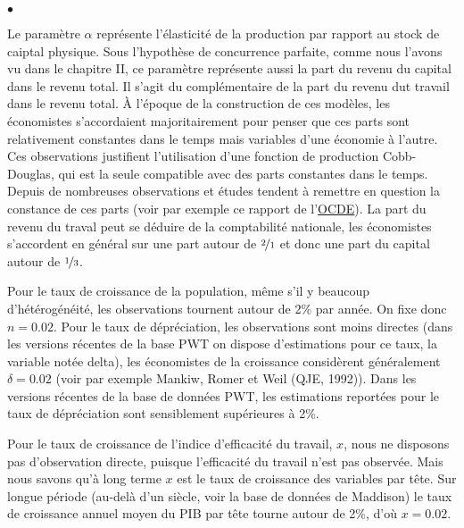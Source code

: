 \documentclass[10pt,notheorems]{beamer}
\theoremstyle{plain}
\theoremstyle{definition} %
\begin{document}
\begin{notes}

  \begin{list}{$\bullet$}{}

  \item Le paramètre $\alpha$ représente l'élasticité de la production par
    rapport au stock de caiptal physique. Sous l'hypothèse de concurrence
    parfaite, comme nous l'avons vu dans le chapitre II, ce paramètre représente
    aussi la part du revenu du capital dans le revenu total. Il s'agit du
    complémentaire de la part du revenu dut travail dans le revenu total. À
    l'époque de la construction de ces modèles, les économistes s'accordaient
    majoritairement pour penser que ces parts sont relativement constantes dans
    le temps mais variables d'une économie à l'autre. Ces observations
    justifient l'utilisation d'une fonction de production Cobb-Douglas, qui est
    la seule compatible avec des parts constantes dans le temps. Depuis de
    nombreuses observations et études tendent à remettre en question la
    constance de ces parts (voir par exemple ce rapport de
    l'\href{https://www.oecd.org/g20/topics/employment-and-social-policy/The-Labour-Share-in-G20-Economies.pdf}{OCDE}).
    La part du revenu du traval peut se déduire de la comptabilité nationale,
    les économistes s'accordent en général sur une part autour de
    $\nicefrac{2}{1}$ et donc une part du capital autour de $\nicefrac{1}{3}$.\newline

  \item Pour le taux de croissance de la population, même s'il y beaucoup
    d'hétérogénéité, les observations tournent autour de 2\% par année. On fixe
    donc $n=0.02$. Pour le taux de dépréciation, les observations sont moins
    directes (dans les versions récentes de la base PWT on dispose d'estimations
    pour ce taux, la variable notée \textrm{delta}), les économistes de la
    croissance considèrent généralement $\delta=0.02$ (voir par exemple Mankiw,
    Romer et Weil (QJE, 1992)). Dans les versions récentes de la base de données
    PWT, les estimations reportées pour le taux de dépréciation sont
    sensiblement supérieures à 2\%.

  \item Pour le taux de croissance de l'indice d'efficacité du travail, $x$,
    nous ne disposons pas d'observation directe, puisque l'efficacité du travail
    n'est pas observée. Mais nous savons qu'à long terme $x$ est le taux de
    croissance des variables par tête. Sur longue période (au-delà d'un siècle,
    voir la base de données de Maddison) le taux de croissance annuel moyen du
    PIB par tête tourne autour de 2\%, d'où $x =0.02$.


\end{list}
\end{notes}
\end{document}

